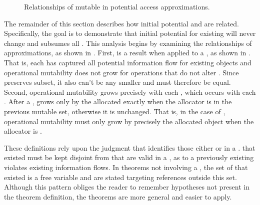 \begin{figure}
\COQDOCAGProjectMaximal{} %
\COQDOCmutableMaximal %
\COQDOCmutableProjectNotInEq %
\COQDOCmutableProjectInEq %
\caption{Relationships of mutable in potential access approximations. \label{fig:flow:AGProjectMaximal}\label{fig:flow:mutableExecuteProp}}
\end{figure}

The remainder of this section describes how initial potential \TMmutability{} and \TMmutablePotAccExecute{} are related.
Specifically, the goal is to demonstrate that initial potential \TMmutability{} for existing \TMobjs{} will never change and subsumes all \TMmutablePotAccExecute{}.
This analysis begins by examining the relationships of \TMpotAcc{} approximations, as shown in .
First, \COQmutable{} is a \TMmaximal{} result when applied to a \TMmaximal{} \TMaccessGraph{}, as shown in \COQmutableMaximal{}. 
That is, each \TMpotAccAG{} has captured all potential information flow for existing objects and operational mutability does not grow for operations that do not alter \TMpotAcc{}.
Since \COQmutable{} preserves subset, it also can't be any smaller and must therefore be equal.
Second, operational mutability grows precisely with each \TMAGprojection{}, which occurs with each \TMallocation{}.
After a \TMAGprojection{}, \TMmutableExecute{} grows only by the allocated \TMobj{} exactly when the allocator is in the previous mutable set, otherwise it is unchanged.
That is, in the case of \COQallocate{}, operational mutability must only grow by precisely the allocated object when the allocator is \TMmutable{}.

These definitions rely upon the \COQobjExisted{} judgment that identifies those \TMobjs{} either \TMalive{} or \TMdead{} in a \TMsystemState{}.
\xmakefirstuc{\TMobjs} that existed must be kept disjoint from \TMobjs{} that are valid in a \TMAGprojection{}, as \TMAGprojecting{} to a previously existing \TMobj{} violates existing information flows.
In theorems not involving a \TMsystemState{}, the set of \TMobjs{} that existed is a free variable and \TMAGprojections{} are stated targeting references outside this set.
Although this pattern obliges the reader to remember hypotheses not present in the theorem definition, the theorems are more general and easier to apply.


